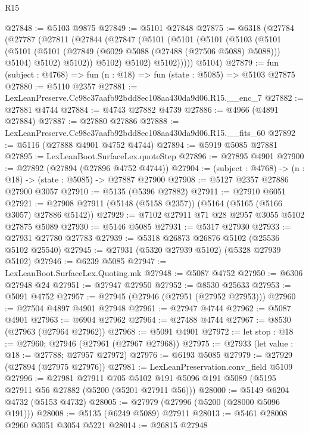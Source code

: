 \begin{lexlean}{R15}
\begin{coremodule}
{{{{{{{{{{{@27848 := @5103 @9875
@27849 := @5101 @27848
@27875 := @6318
    (@27784
      (@27787
        (@27811
          (@27844
            (@27847
              (@5101
                (@5101
                  (@5101
                    (@5103
                      (@5101
                        (@5101
                          (@5101 (@27849 (@6029 @5088 (@27488 (@27506 @5088) @5088))) @5104)
                          @5102)
                        @5102))
                    @5102)
                  @5102)
                @5102)))))
      @5104)
@27879 := fun (subject : @4768) => fun (n : @18) => fun (state : @5085) => @5103 @27875
@27880 := @5110 @2357
@27881 := LexLeanPreserve.Cc98c37aafb92bdd8ec108aa430da9d06.R15.__enc_7
@27882 := @27881 @4744
@27884 := @4743 @27882 @4739
@27886 := @4966 (@4891 @27884)
@27887 := @27880 @27886
@27888 := LexLeanPreserve.Cc98c37aafb92bdd8ec108aa430da9d06.R15.__fits_60
@27892 := @5116 (@27888 @4901 @4752 @4744)
@27894 := @5919 @5085 @27881
@27895 := LexLeanBoot.SurfaceLex.quoteStep
@27896 := @27895 @4901
@27900 := @27892 (@27894 (@27896 @4752 @4744))
@27904 := (subject : @4768) -> (n : @18) -> (state : @5085) -> @27887 @27900
@27908 := @5127 @2357 @27886 @27900 @3057
@27910 := @5135 (@5396 @27882)
@27911 := @27910 @6051
@27921 := @27908 @27911 (@5148 (@5158 @2357)) (@5164 (@5165 (@5166 @3057) @27886 @5142))
@27929 := @7102 @27911 @71 @28 @2957 @3055 @5102 @27875 @5089
@27930 := @5146 @5085
@27931 := @5317 @27930
@27933 := @27931 @27780 @27783
@27939 := @5318 @26873 @26876 @5102 (@25536 @5102 @25540)
@27945 := @27931 (@5320 @27939 @5102) (@5328 @27939 @5102)
@27946 := @6239 @5085
@27947 := LexLeanBoot.SurfaceLex.Quoting.mk
@27948 := @5087 @4752
@27950 := @6306 @27948 @24
@27951 := @27947 @27950
@27952 := @8530 @25633
@27953 := @5091 @4752
@27957 := @27945 (@27946 (@27951 (@27952 @27953)))
@27960 := @27504 @4897 @4901 @27948
@27961 := @27947 @4744
@27962 := @5087 @4901
@27963 := @6904 @27962
@27964 := @27488 @4744
@27967 := @8530 (@27963 (@27964 @27962))
@27968 := @5091 @4901
@27972 := let stop : @18 := @27960; @27946 (@27961 (@27967 @27968))
@27975 := @27933 (let value : @18 := @27788; @27957 @27972)
@27976 := @6193 @5085
@27979 := @27929 (@27894 (@27975 @27976))
@27981 := LexLeanPreservation.conv_field @5109
@27996 := @27981
    @27911
    @705
    @5102
    @191
    @5096
    @191
    @5089
    (@5195 @27911 @56 @27882 (@5200 (@5201 @27911 @56)))
@28000 := @5149 @6204 @4732 (@5153 @4732)
@28005 := @27979 (@27996 (@5200 (@28000 @5096 @191)))
@28008 := @5135 (@6249 @5089) @27911
@28013 := @5461 @28008 @2960 @3051 @3054 @5221
@28014 := @26815 @27948
}}}}}}}}}}}
\end{coremodule}
\end{lexlean}
